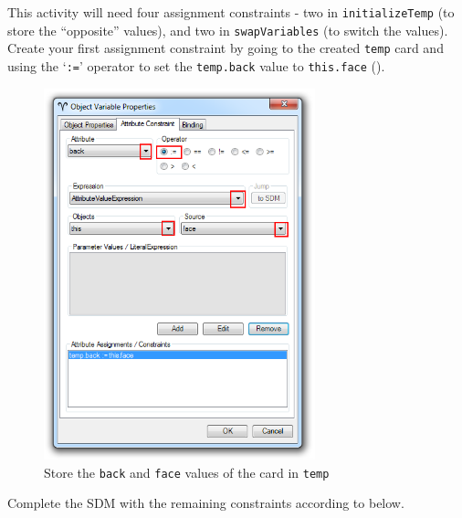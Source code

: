 \begin{stepbystep}
\item This activity will need four assignment constraints - two in \texttt{in\-it\-ia\-lize\-Temp} (to store the ``opposite'' values),
and two in \texttt{swapVariables} (to switch the values). Create your first assignment constraint by going to the created \texttt{temp} card and using the
`\texttt{:=}' operator to set the \texttt{temp.back} value to \texttt{this.face} ().

\begin{figure}[htbp]
\begin{center}
  \includegraphics[width=0.7\textwidth]{../../org.moflon.doc.handbook.03_storyDiagrams/07_invertCard/visICImages/ea_invertAttConstAssign}
  \caption{Store the \texttt{back} and \texttt{face} values of the card in \texttt{temp}}  
  \label{ea:sdm_invertAssignment}
\end{center}
\end{figure}

\clearpage

\vspace*{0.5cm}

\item Complete the SDM with the remaining constraints according to  below.

\vspace{0.5cm}


\end{stepbystep}
